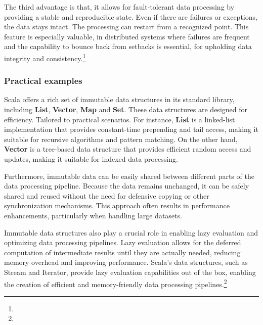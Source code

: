 The third advantage is that, it allows for fault-tolerant data processing by providing a stable and reproducible state. Even if there are failures or exceptions, the data stays intact. The processing can restart from a recognized point. This feature is especially valuable, in distributed systems where failures are frequent and the capability to bounce back from setbacks is essential, for upholding data integrity and consistency.\footnote[7]{}

\subsubsection{Practical examples}

Scala offers a rich set of immutable data structures in its standard library, including \textbf{List}, \textbf{Vector}, \textbf{Map} and \textbf{Set}. These data structures are designed for efficiency. Tailored to practical scenarios. For instance, \textbf{List} is a linked-list implementation that provides constant-time prepending and tail access, making it suitable for recursive algorithms and pattern matching. On the other hand, \textbf{Vector} is a tree-based data structure that provides efficient random access and updates, making it suitable for indexed data processing.\footnotemark {}



Furthermore, immutable data can be easily shared between different parts of the data processing pipeline. Because the data remains unchanged, it can be safely shared and reused without the need for defensive copying or other synchronization mechanisms. This approach often results in performance enhancements, particularly when handling large datasets.\footnotemark {}



Immutable data structures also play a crucial role in enabling lazy evaluation and optimizing data processing pipelines. Lazy evaluation allows for the deferred computation of intermediate results until they are actually needed, reducing memory overhead and improving performance. Scala's data structures, such as Stream and Iterator, provide lazy evaluation capabilities out of the box, enabling the creation of efficient and memory-friendly data processing pipelines.\footnote[9]{}



